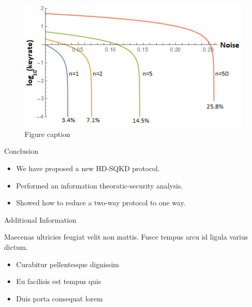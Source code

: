 \documentclass[final]{beamer}
\newlength{\onecolwid}
\begin{document}
\begin{frame}[t]
\begin{columns}[t]
\begin{column}{\onecolwid}

\begin{figure}
	\includegraphics[width=0.8\linewidth]{keyrate-ind.png}
	\caption{Figure caption}
\end{figure}

\begin{block}{Conclusion}

\begin{itemize}
	\item We have proposed a new HD-SQKD protocol.
	\item Performed an information theoratic-security analysis. 
	\item Showed how to reduce a two-way protocol to one way. 
\end{itemize}

\end{block}


\begin{block}{Additional Information}

Maecenas ultricies feugiat velit non mattis. Fusce tempus arcu id ligula varius dictum. 
\begin{itemize}
\item Curabitur pellentesque dignissim
\item Eu facilisis est tempus quis
\item Duis porta consequat lorem
\end{itemize}

\end{block}


\end{column}
\end{columns}
\end{frame}
\end{document}

